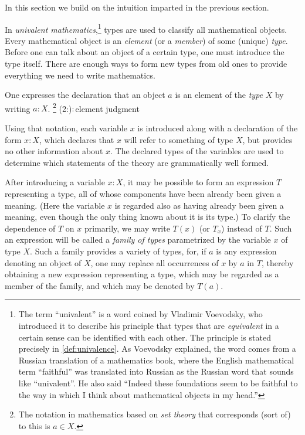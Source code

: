 In this section we build on the intuition imparted in the previous section.

In \emph{univalent mathematics},\footnote{The term ``univalent'' is a word coined by Vladimir Voevodsky, who
introduced it to describe his principle that types that are \emph{equivalent} in a certain sense can be identified with each other.  The
principle is stated precisely in \cref{def:univalence}.  As Voevodsky explained, the word comes from a Russian translation of a mathematics
book, where the English mathematical term ``faithful'' was translated into Russian as the Russian word that sounds like ``univalent''.  He also
said ``Indeed these foundations seem to be faithful to the way in which I think about mathematical objects in my head.''} types are used to
classify all mathematical objects.  Every mathematical object is an \emph{element} (or a \emph{member}) of some (unique) \emph{type}.  Before
one can talk about an object of a certain type, one must introduce the type itself.  There are enough ways to form new types from old ones to
provide everything we need to write mathematics.

One expresses the declaration that an object $a$ is an element of the \emph{type} $X$ by writing $a:X$.%
\footnote{The notation in mathematics based on \emph{set theory} that corresponds (sort of) to this is $a \in X$.}
\glossary(2:){${:}$}{element judgment}

Using that notation, each variable $x$ is introduced along with a declaration of the form $x:X$, which declares that $x$ will refer to something
of type $X$, but provides no other information about $x$.  The declared types of the variables are used to determine which statements of the
theory are grammatically well formed.

After introducing a variable $x:X$, it may be possible to form an expression $T$ representing a type, all of whose components have
been already been given a meaning.
(Here the variable $x$ is regarded also as having already been given a meaning, even though the only thing known about it is its type.)
To clarify the dependence of $T$ on $x$ primarily, we may write $T(x)$ (or $T_x$) instead of $T$.
Such an expression will be called a \emph{family of types}  parametrized by the variable $x$ of type $X$.
Such a family provides a variety of types, for, if $a$ is any expression denoting an object of $X$, one may replace all
occurrences of $x$ by $a$ in $T$, thereby obtaining a new expression representing a type, which may be regarded as a member of the family,
and which may be denoted by $T(a)$.

